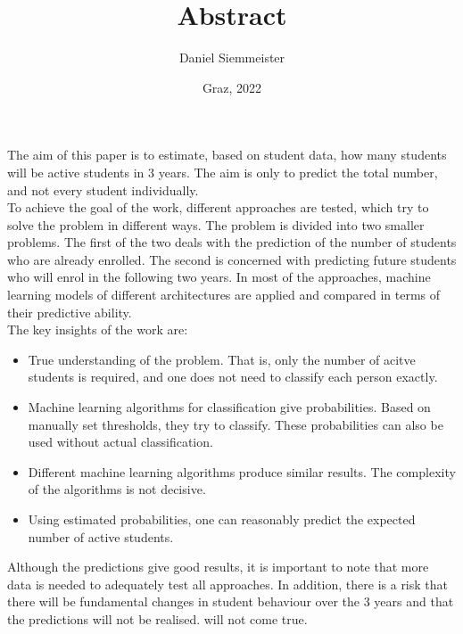 \documentclass[a4paper, english,12pt]{article}
\title{Abstract}
\author{Daniel Siemmeister}
\date{Graz, 2022}
\begin{document}
\maketitle
\thispagestyle{empty}

The aim of this paper is to estimate, based on student data, how many students will be active
students in 3 years. The aim is only to predict the total number, and not every student individually. \\

To achieve the goal of the work, different approaches are tested, which try to solve the problem in different ways.
The problem is divided into two smaller problems. The first of the two deals with the prediction of the number of students who are already enrolled.
The second is concerned with predicting future students who will enrol in the following two years.
In most of the approaches, machine learning models of different architectures are applied and compared in terms of their predictive ability. \\ 

The key insights of the work are:
\begin{itemize}
    \item True understanding of the problem. That is, only the number of acitve students is required, and one does not need to classify each person exactly.
    \item Machine learning algorithms for classification give probabilities. Based on manually set thresholds, they try to classify.
    These probabilities can also be used without actual classification.
    \item Different machine learning algorithms produce similar results. The complexity of the algorithms is not decisive.
    \item Using estimated probabilities, one can reasonably predict the expected number of active students.
\end{itemize}

Although the predictions give good results, it is important to note that more data is needed to adequately test all approaches. 
In addition, there is a risk that there will be fundamental changes in student behaviour over the 3 years and that the predictions will not be realised. 
will not come true.
\end{document}
